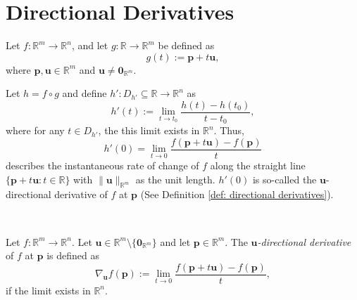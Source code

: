 

\section{Directional Derivatives}


\begin{observation}
	\label{obs: motivation of directional derivatives}
	Let $f: \mathbb R^m \to \mathbb R^n$, and let $g:\mathbb R \to \mathbb R^m$ be defined as
	$$
	g(t) := \mathbf p + t \mathbf u,
	$$
	where $\mathbf p , \mathbf u \in \mathbb R^m$ and $\mathbf u \ne \mathbf 0_{\mathbb R^m}$.
	
	Let $h = f \circ g$ and define $h': D_{h'} \subseteq \mathbb R \to \mathbb R^n$ as
	$$
	h'(t) :=\lim_{t \to t_0} \frac{h(t) - h(t_0)}{t - t_0},
	$$
	where for any $t \in D_{h'}$, the this limit exists in $\mathbb R^n$. Thus,
	$$
	h'(0) = \lim_{t \to 0} \frac{f(\mathbf p + t \mathbf u) - f(\mathbf p)}{t}
	$$
	describes the instantaneous rate of change of $f$ along the straight line $\{ \mathbf p + t\mathbf u : t \in \mathbb R \}$ with $\|\mathbf u \|_{\mathbb R^m}$ as the unit length. $h'(0)$ is so-called the $\mathbf u$-directional derivative of $f$ at $\mathbf p$ (See Definition \ref{def: directional derivatives}).
\end{observation}


\begin{definition}
	\label{def: directional derivatives}
	\
	
	Let $f: \mathbb R^m \to \mathbb R^n$. Let $\mathbf u \in \mathbb R^{m} \setminus \{ \mathbf 0_{\mathbb R^m} \}$ and let $\mathbf p \in \mathbb R^m$. The \textit{$\mathbf u$-directional derivative} of $f$ at $\mathbf p$ is defined as
	$$
	\nabla_{\mathbf u} f(\mathbf p) := \lim_{t \to 0} \frac{f(\mathbf p + t \mathbf u) - f(\mathbf p)}{t},
	$$
	if the limit exists in $\mathbb R^n$.
\end{definition}


